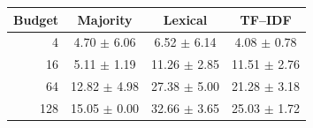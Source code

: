 \begin{tabular}{rccc}
\toprule
Budget & Majority & Lexical & TF--IDF \\\midrule
4 & 4.70 $\pm$ 6.06 & 6.52 $\pm$ 6.14 & 4.08 $\pm$ 0.78 \\
16 & 5.11 $\pm$ 1.19 & 11.26 $\pm$ 2.85 & 11.51 $\pm$ 2.76 \\
64 & 12.82 $\pm$ 4.98 & 27.38 $\pm$ 5.00 & 21.28 $\pm$ 3.18 \\
128 & 15.05 $\pm$ 0.00 & 32.66 $\pm$ 3.65 & 25.03 $\pm$ 1.72 \\
\bottomrule
\end{tabular}
